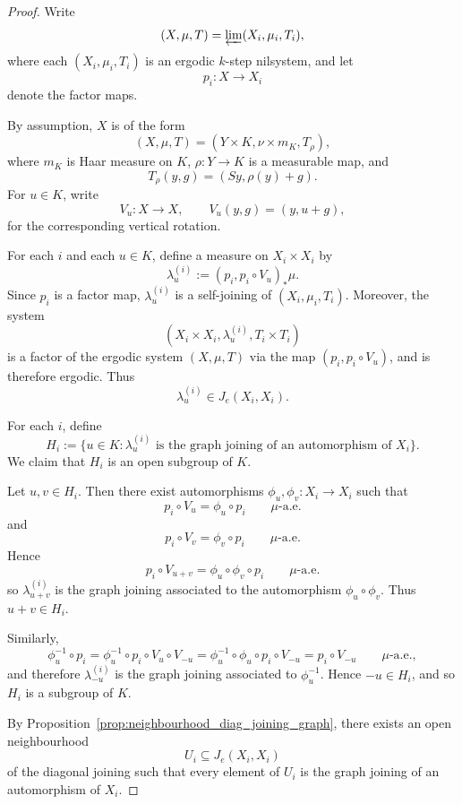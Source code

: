 \documentclass[10pt,a4paper]{amsart}
\begin{document}
\begin{proof}
    Write
    \[
    (X,\mu,T)=\varprojlim (X_i,\mu_i,T_i),
    \]
    where each $(X_i,\mu_i,T_i)$ is an ergodic $k$-step nilsystem, and let
    \[
    p_i\colon X\to X_i
    \]
    denote the factor maps.

    By assumption, $X$ is of the form 
    \[
    (X,\mu,T)=(Y\times K,\nu\times m_K,T_\rho),
    \]
    where $m_K$ is Haar measure on $K$, $\rho\colon Y\to K$ is a measurable map, and
    \[
    T_\rho(y,g)=(Sy,\rho(y)+g).
    \]
    For $u\in K$, write
    \[
    V_u\colon X\to X,\qquad V_u(y,g)=(y,u+g),
    \]
    for the corresponding vertical rotation.

    For each $i$ and each $u\in K$, define a measure on $X_i\times X_i$ by
    \[
    \lambda_u^{(i)}:=(p_i,p_i\circ V_u)_*\mu.
    \]
    Since $p_i$ is a factor map, $\lambda_u^{(i)}$ is a self-joining of $(X_i,\mu_i,T_i)$.
    Moreover, the system
    \[
    (X_i\times X_i,\lambda_u^{(i)},T_i\times T_i)
    \]
    is a factor of the ergodic system $(X,\mu,T)$ via the map $(p_i,p_i\circ V_u)$, and is therefore ergodic.
    Thus
    \[
    \lambda_u^{(i)}\in J_e(X_i,X_i).
    \]

    For each $i$, define
    \[
    H_i:=\{u\in K : \lambda_u^{(i)} \text{ is the graph joining of an automorphism of }X_i\}.
    \]
    We claim that $H_i$ is an open subgroup of $K$.

    Let $u,v\in H_i$.
    Then there exist automorphisms $\phi_u,\phi_v\colon X_i\to X_i$ such that
    \[
    p_i\circ V_u=\phi_u\circ p_i \qquad \mu\text{-a.e.}
    \]
    and
    \[
    p_i\circ V_v=\phi_v\circ p_i \qquad \mu\text{-a.e.}
    \]
    Hence
    \[
    p_i\circ V_{u+v}
    =\phi_u\circ \phi_v\circ p_i
    \qquad \mu\text{-a.e.}
    \]
    so $\lambda_{u+v}^{(i)}$ is the graph joining associated to the automorphism $\phi_u\circ\phi_v$.
    Thus $u+v\in H_i$.

    Similarly,
    \[
    \phi_u^{-1}\circ p_i
    =\phi_u^{-1}\circ p_i\circ V_u\circ V_{-u}
    =\phi_u^{-1}\circ \phi_u\circ p_i\circ V_{-u}
    =p_i\circ V_{-u}
    \qquad \mu\text{-a.e.},
    \]
    and therefore $\lambda_{-u}^{(i)}$ is the graph joining associated to $\phi_u^{-1}$.
    Hence $-u\in H_i$, and so $H_i$ is a subgroup of $K$.

    By Proposition~\ref{prop:neighbourhood_diag_joining_graph}, there exists an open neighbourhood
    \[
    U_i\subseteq J_e(X_i,X_i)
    \]
    of the diagonal joining such that every element of $U_i$ is the graph joining of an automorphism of $X_i$.
    

\end{proof}
\end{document}
